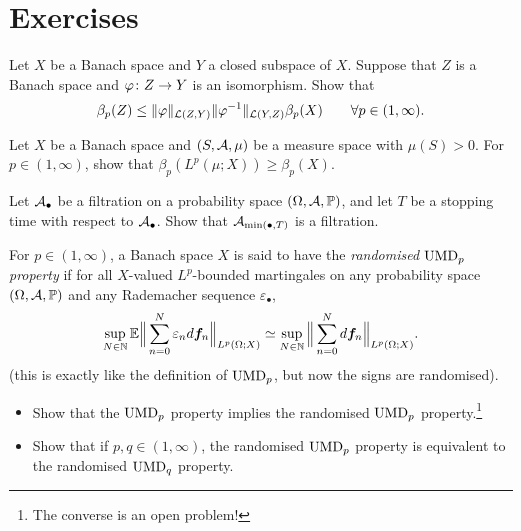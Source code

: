 \section*{Exercises}

\begin{exercise}\label{ex:UMD-isomorphism}
  Let $X$ be a Banach space and $Y$ a closed subspace of $X$.
  Suppose that $Z$ is a Banach space and $\varphi \colon Z \rightarrow Y$ is an isomorphism.
  Show that 
  \begin{equation*}
    \beta_{p}(Z) \leq \|\varphi\|_{\mathcal{L}(Z,Y)} \|\varphi^{-1}\|_{\mathcal{L}(Y,Z)} \beta_{p}(X) \qquad \forall p \in (1,\infty).
  \end{equation*}
\end{exercise}

\begin{exercise}\label{ex:UMD-Lp-reverse}
  Let $X$ be a Banach space and $(S,\mathcal{A},\mu)$ be a measure space with $\mu(S) > 0$.
  For $p \in (1,\infty)$, show that $\beta_{p}(L^p(\mu;X)) \geq \beta_{p}(X)$.
\end{exercise}

\begin{exercise}\label{ex:stopped-filtration}
  Let $\mathcal{A}_{\bullet}$ be a filtration on a probability space $(\Omega,\mathcal{A},\mathbb{P})$, and let $T$ be a stopping time with respect to $\mathcal{A}_{\bullet}$.
  Show that $\mathcal{A}_{\min(\bullet,T)}$ is a filtration.
\end{exercise}

\begin{exercise}
  For $p \in (1,\infty)$, a Banach space $X$ is said to have the \emph{randomised $\mathrm{UMD}_{p}$ property} if for all $X$-valued $L^p$-bounded martingales on any probability space $(\Omega,\mathcal{A},\mathbb{P})$ and any Rademacher sequence $\varepsilon_{\bullet}$,
  \begin{equation*}
    \sup_{N \in \mathbb{N}} \mathbb{E} \Big\| \sum_{n=0}^{N} \varepsilon_{n} d\bm{f}_{n} \Big\|_{L^p(\Omega;X)} \simeq \sup_{N \in \mathbb{N}} \Big\| \sum_{n=0}^{N} d\bm{f}_{n} \Big\|_{L^p(\Omega;X)}.
  \end{equation*}
  (this is exactly like the definition of $\mathrm{UMD}_{p}$, but now the signs are randomised).

  \begin{itemize}
  \item Show that the $\mathrm{UMD}_{p}$ property implies the randomised $\mathrm{UMD}_{p}$ property.\footnote{The converse is an open problem!}
  \item Show that if $p,q \in (1,\infty)$, the randomised $\mathrm{UMD}_{p}$ property is equivalent to the randomised $\mathrm{UMD}_{q}$ property.
  \end{itemize}

\end{exercise}

